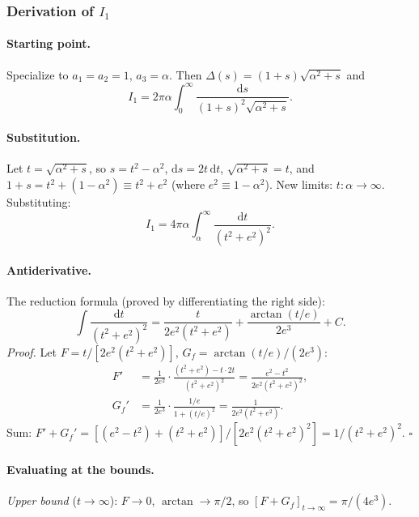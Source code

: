 \documentclass[5p,sort&compress]{elsarticle}
\begin{document}
\subsubsection{Derivation of $I_1$}
\label{sec:I1}

\paragraph{Starting point.}
Specialize to $a_1=a_2=1$, $a_3=\alpha$. Then
$\Delta(s)=(1+s)\sqrt{\alpha^2+s}$ and
\begin{equation}
  I_1=2\pi\alpha\int_0^\infty\frac{\mathrm ds}
  {(1+s)^2\sqrt{\alpha^2+s}}.
  \label{eq:I1start}
\end{equation}

\paragraph{Substitution.}
Let $t=\sqrt{\alpha^2+s}$, so $s=t^2-\alpha^2$, $\mathrm ds=2t\,\mathrm dt$,
$\sqrt{\alpha^2+s}=t$, and $1+s=t^2+(1-\alpha^2)\equiv t^2+e^2$
(where $e^2\equiv1-\alpha^2$). New limits: $t:\alpha\to\infty$.
Substituting:
\begin{equation}
  I_1=4\pi\alpha\int_\alpha^\infty\frac{\mathrm dt}{(t^2+e^2)^2}.
  \label{eq:I1sub}
\end{equation}

\paragraph{Antiderivative.}
The reduction formula (proved by differentiating the right side):
\begin{equation}
  \int\frac{\mathrm dt}{(t^2+e^2)^2}=
  \frac{t}{2e^2(t^2+e^2)}+\frac{\arctan(t/e)}{2e^3}+C.
  \label{eq:antideriv}
\end{equation}
\textit{Proof.} Let $F=t/[2e^2(t^2{+}e^2)]$,
$G_f=\arctan(t/e)/(2e^3)$:
\begin{align*}
  F'&=\frac{1}{2e^2}\cdot\frac{(t^2+e^2)-t\cdot2t}{(t^2+e^2)^2}
    =\frac{e^2-t^2}{2e^2(t^2+e^2)^2},\\
  G_f'&=\frac{1}{2e^3}\cdot\frac{1/e}{1+(t/e)^2}
    =\frac{1}{2e^2(t^2+e^2)}.
\end{align*}
Sum: $F'+G_f'=[(e^2-t^2)+(t^2+e^2)]/[2e^2(t^2+e^2)^2]
=1/(t^2+e^2)^2$. $\square$

\paragraph{Evaluating at the bounds.}
\textit{Upper bound} ($t\to\infty$): $F\to0$, $\arctan\to\pi/2$, so
$[F+G_f]_{t\to\infty}=\pi/(4e^3)$.
\end{document}
